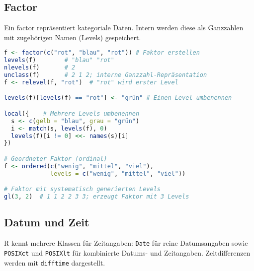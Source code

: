 \documentclass[10pt,twocolumn]{scrartcl}
\begin{document}
\subsection{Factor}

Ein factor repräsentiert kategoriale Daten. Intern werden diese als Ganzzahlen mit zugehörigen Namen (Levels) gespeichert.

\begin{lstlisting}[language=R]
f <- factor(c("rot", "blau", "rot")) # Faktor erstellen
levels(f)        # "blau" "rot"
nlevels(f)       # 2
unclass(f)       # 2 1 2; interne Ganzzahl-Repräsentation
f <- relevel(f, "rot")  # "rot" wird erster Level

levels(f)[levels(f) == "rot"] <- "grün" # Einen Level umbenennen

local({    # Mehrere Levels umbenennen
  s <- c(gelb = "blau", grau = "grün")
  i <- match(s, levels(f), 0)
  levels(f)[i != 0] <<- names(s)[i]
})

# Geordneter Faktor (ordinal)
f <- ordered(c("wenig", "mittel", "viel"),
             levels = c("wenig", "mittel", "viel"))

# Faktor mit systematisch generierten Levels
gl(3, 2)  # 1 1 2 2 3 3; erzeugt Faktor mit 3 Levels
\end{lstlisting}

\subsection{Datum und Zeit}

R kennt mehrere Klassen für Zeitangaben:
\lstinline|Date| für reine Datumsangaben sowie
\lstinline|POSIXct| und \lstinline|POSIXlt| für kombinierte Datums- und Zeitangaben.
Zeitdifferenzen werden mit \lstinline|difftime| dargestellt.
\end{document}
